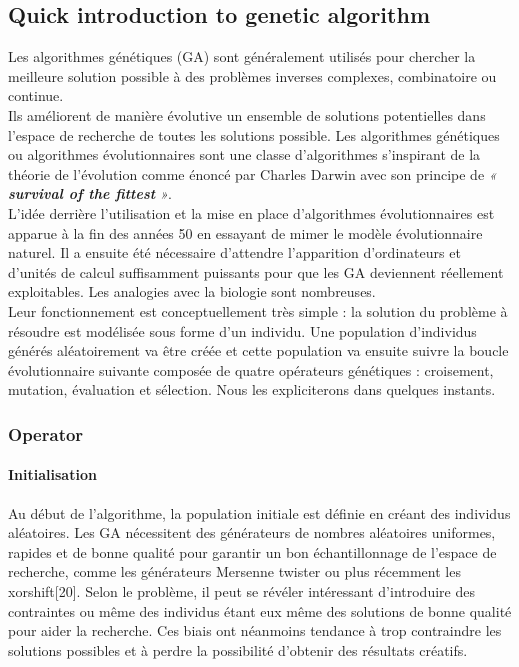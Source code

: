 \documentclass[12pt]{memoir}
\begin{document}
\subsection{Quick introduction to genetic algorithm} %
\label{sub:Quick introduction to genetic algorithm}
Les algorithmes génétiques (GA) sont généralement utilisés pour chercher
la meilleure solution possible à des problèmes inverses complexes,
combinatoire ou continue. \\
Ils améliorent de manière évolutive un ensemble de solutions
potentielles dans l'espace de recherche de toutes les solutions
possible. Les algorithmes génétiques ou algorithmes évolutionnaires sont
une classe d'algorithmes s'inspirant de la théorie de l'évolution comme
énoncé par Charles Darwin avec son principe de \emph{« \textbf{survival
of the fittest} »}. \\ 
L'idée derrière l'utilisation et la mise en place
d'algorithmes évolutionnaires est apparue à la fin des années 50\cite{john1992adaptation} en
essayant de mimer le modèle évolutionnaire naturel. Il a ensuite été
nécessaire d'attendre l'apparition d'ordinateurs et d'unités de calcul
suffisamment puissants pour que les GA deviennent réellement
exploitables. Les analogies avec la biologie sont nombreuses. \\
Leur fonctionnement est conceptuellement très simple : la solution du
problème à résoudre est modélisée sous forme d'un individu. Une
population d'individus générés aléatoirement va être créée et cette
population va ensuite suivre la boucle évolutionnaire suivante composée
de quatre opérateurs génétiques : croisement, mutation, évaluation et
sélection. Nous les expliciterons dans quelques instants.


\subsubsection{Operator} %
\label{sub:}
\paragraph{Initialisation} %
\label{par:Initialisation}
Au début de l’algorithme, la population initiale est définie en créant des individus
aléatoires. Les GA nécessitent des générateurs de nombres aléatoires uniformes, rapides et
de bonne qualité pour garantir un bon échantillonnage de l’espace de recherche, comme
les générateurs Mersenne twister ou plus récemment les xorshift[20].
Selon le problème, il peut se révéler intéressant d’introduire des contraintes ou même
des individus étant eux même des solutions de bonne qualité pour aider la recherche.
Ces biais ont néanmoins tendance à trop contraindre les solutions possibles et à perdre
la possibilité d’obtenir des résultats créatifs.
\end{document}
